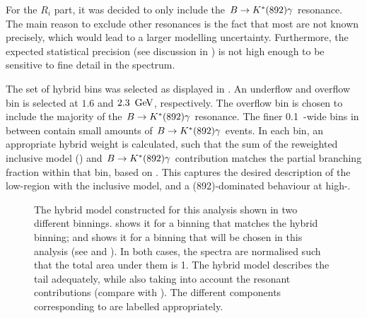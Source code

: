 For the $R_i$ part, it was decided to only include the $B\rightarrow K^*(892)\gamma$ resonance.
The main reason to exclude other resonances is the fact that most are not known precisely, which would lead to a larger modelling uncertainty.
Furthermore, the expected statistical precision (see discussion in ) is not high enough to be sensitive to fine detail in the spectrum.

The set of hybrid bins was selected as displayed in .
An underflow and overflow bin is selected at $1.6$ and $2.3~\mathrm{\,Ge\kern -0.1em V}$, respectively.
The overflow bin is chosen to include the majority of the $B\rightarrow K^*(892)\gamma$ resonance.
The finer 0.1~\gev-wide bins in between contain small amounts of $B\rightarrow K^*(892)\gamma$ events.
In each \EB bin, an appropriate hybrid weight is calculated, such that the sum of the reweighted inclusive model () and \mbox{$B\rightarrow K^*(892)\gamma$} contribution matches the partial branching fraction within that \EB bin, based on .
This captures the desired description of the low-\EB region with the inclusive model, and a \Kstar(892)-dominated behaviour at high-\EB.

\begin{figure}[htbp!]
    \caption{\label{fig:hybrid_bins_and_model} The hybrid model constructed for this analysis 
    shown in two different binnings.
     shows it for a binning that matches the hybrid binning; 
    and  shows it for a binning that will 
    be chosen in this analysis (see  and ).
    In both cases, the spectra are normalised such that the total area under them is 1.
    The hybrid model describes the tail adequately, 
    while also taking into account the resonant contributions (compare with ).
    The different components corresponding to  are labelled appropriately.
    }
\end{figure}

